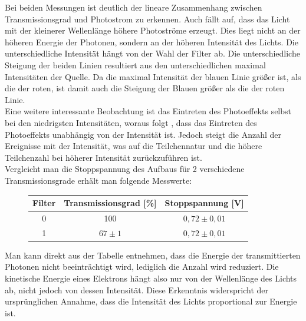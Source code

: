 \documentclass{scrartcl}
\begin{document}
		Bei beiden Messungen ist deutlich der lineare Zusammenhang zwischen Transmissionsgrad und Photostrom zu erkennen.
		Auch fällt auf, dass das Licht mit der kleinerer Wellenlänge höhere Photoströme erzeugt. Dies liegt nicht an der höheren Energie
		der Photonen, sondern an der höheren Intensität des Lichts. Die unterschiedliche Intensität hängt von der Wahl der Filter ab.
		Die unterschiedliche Steigung der beiden Linien resultiert aus den unterschiedlichen maximal Intensitäten der Quelle. 
		Da die maximal Intensität der blauen Linie größer ist, als die der roten, ist damit auch die Steigung der Blauen größer als die der roten Linie. \\
		Eine weitere interessante Beobachtung ist das Eintreten des Photoeffekts selbst bei den niedrigsten Intensitäten, woraus folgt
		, dass das Eintreten des Photoeffekts unabhängig von der Intensität ist. Jedoch steigt die Anzahl der Ereignisse mit der Intensität,
		was auf die Teilchennatur und die höhere Teilchenzahl bei höherer Intensität zurückzuführen ist.\\
		Vergleicht man die Stoppspannung des Aufbaus für 2 verschiedene Transmissionsgrade erhält man folgende Messwerte:
		\begin{figure}[H]
			\centering
			\begin{tabular}{|c|c|c|}
				\hline
				Filter & Transmissionsgrad [\%] & Stoppspannung [V] \\
				\hline
				0 & 100 & $0,72\pm 0,01$ \\ 
				1 & $67\pm 1$ & $0,72\pm 0,01$ \\
				\hline
			\end{tabular}
		\end{figure}
		Man kann direkt aus der Tabelle entnehmen, dass die Energie der transmittierten Photonen nicht beeinträchtigt wird, lediglich die 
		Anzahl wird reduziert. Die kinetische Energie eines Elektrons hängt also nur von der Wellenlänge des Lichts ab, nicht jedoch von
		dessen Intensität. Diese Erkenntnis widerspricht der ursprünglichen Annahme, dass die Intensität 
		des Lichts proportional zur Energie ist.
		
\end{document}
